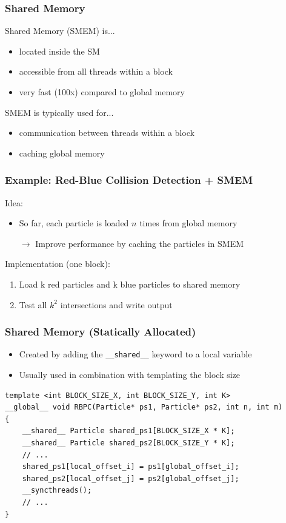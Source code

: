\documentclass[aspectratio=169,handout]{beamer}
\begin{document}
\begin{frame}[fragile]
\frametitle{Shared Memory}

Shared Memory (SMEM) is...
\begin{itemize}
	\item located inside the SM
	\item accessible from all threads within a block
	\item very fast (100x) compared to global memory
\end{itemize}
SMEM is typically used for...
\begin{itemize}
	\item communication between threads within a block
	\item caching global memory
\end{itemize}
\end{frame}




\begin{frame}[fragile]
\frametitle{Example: Red-Blue Collision Detection + SMEM}
Idea:
\begin{itemize}
	\item So far, each particle is loaded $n$ times from global memory
	\item[$\rightarrow$] Improve performance by caching the particles in SMEM
\end{itemize}
Implementation (one block):
\begin{enumerate}
	\item Load k red particles and k blue particles to shared memory
	\item Test all $k^2$ intersections and write output
\end{enumerate}
\end{frame}

\begin{frame}[fragile]
\frametitle{Shared Memory (Statically Allocated)}
\begin{itemize}
	\item Created by adding the \texttt{\_\_shared\_\_} keyword to a local variable
	\item Usually used in combination with templating the block size
\end{itemize}
\begin{lstlisting}
template <int BLOCK_SIZE_X, int BLOCK_SIZE_Y, int K>
__global__ void RBPC(Particle* ps1, Particle* ps2, int n, int m)
{
    __shared__ Particle shared_ps1[BLOCK_SIZE_X * K];
    __shared__ Particle shared_ps2[BLOCK_SIZE_Y * K];
    // ...
    shared_ps1[local_offset_i] = ps1[global_offset_i];
    shared_ps2[local_offset_j] = ps2[global_offset_j];
    __syncthreads();
    // ...
}
\end{lstlisting}
\end{frame}
\end{document}
